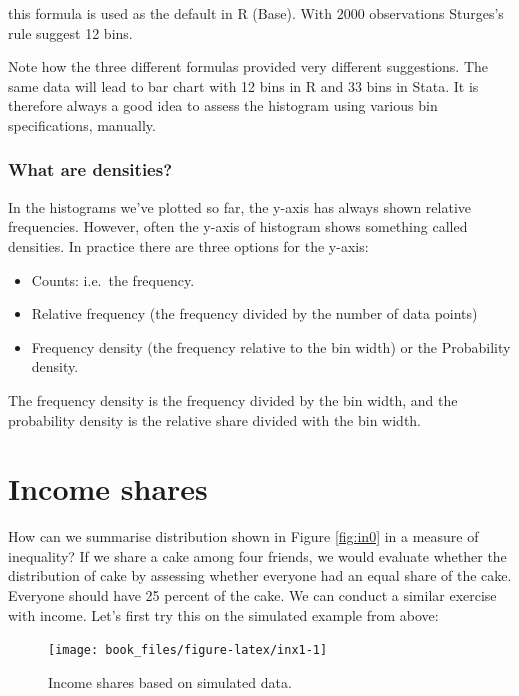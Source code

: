 \documentclass[]{book}
\providecommand{\tightlist}{%
  \setlength{\itemsep}{0pt}\setlength{\parskip}{0pt}}
\begin{document}
this formula is used as the default in R (Base). With 2000 observations Sturges's rule suggest 12 bins.

Note how the three different formulas provided very different suggestions. The same data will lead to bar chart with 12 bins in R and 33 bins in Stata. It is therefore always a good idea to assess the histogram using various bin specifications, manually.

\hypertarget{what-are-densities}{%
\subsubsection*{What are densities?}\label{what-are-densities}}

In the histograms we've plotted so far, the y-axis has always shown relative frequencies. However, often the y-axis of histogram shows something called densities. In practice there are three options for the y-axis:

\begin{itemize}
\tightlist
\item
  Counts: i.e.~the frequency.
\item
  Relative frequency (the frequency divided by the number of data points)
\item
  Frequency density (the frequency relative to the bin width) or the Probability density.
\end{itemize}

The frequency density is the frequency divided by the bin width, and the probability density is the relative share divided with the bin width.

\hypertarget{income-shares}{%
\section{Income shares}\label{income-shares}}

How can we summarise distribution shown in Figure \ref{fig:in0} in a measure of inequality? If we share a cake among four friends, we would evaluate whether the distribution of cake by assessing whether everyone had an equal share of the cake. Everyone should have 25 percent of the cake. We can conduct a similar exercise with income. Let's first try this on the simulated example from above:

\begin{figure}

{\centering \texttt{[image: book\_files/figure-latex/inx1-1]} 

}

\caption{\label{fig:figx} Income shares based on simulated data.}\label{fig:inx1}
\end{figure}
\end{document}
